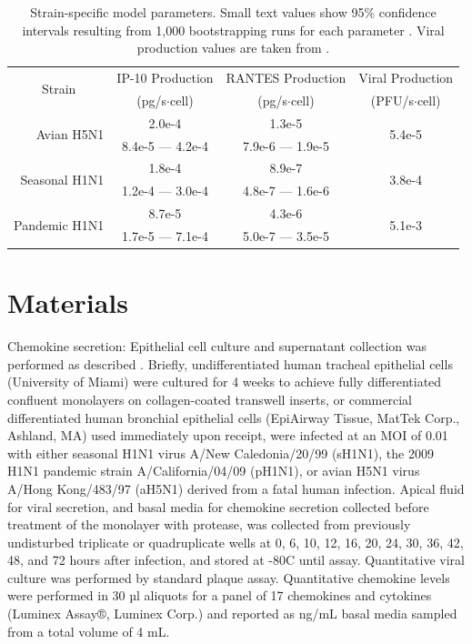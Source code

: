 \documentclass[10pt]{article}
\begin{document}
\begin{table}
\centering
\begin{tabular}{ | r | c | c | c | }
  \hline                        
  \multicolumn{1}{|c|}{\multirow{2}{*}{Strain}} & IP-10 Production & RANTES Production & Viral Production \\
   & \footnotesize{(pg/s$\cdot$cell)}  & \footnotesize{(pg/s$\cdot$cell)} &  \footnotesize{(PFU/s$\cdot$cell)} \\
  \hline
  \multirow{2}{*}{Avian H5N1} & 2.0e-4 &  1.3e-5 & \multirow{2}{*}{5.4e-5} \\
   &  \footnotesize{8.4e-5 --- 4.2e-4} & \footnotesize{7.9e-6 --- 1.9e-5} & \\ 
   \hline
  \multirow{2}{*}{Seasonal H1N1} & 1.8e-4 &  8.9e-7 & \multirow{2}{*}{3.8e-4} \\
   & \footnotesize{1.2e-4 --- 3.0e-4} & \footnotesize{4.8e-7 --- 1.6e-6} &  \\
   \hline
  \multirow{2}{*}{Pandemic H1N1} & 8.7e-5 &  4.3e-6 & \multirow{2}{*}{5.1e-3} \\
   & \footnotesize{1.7e-5 --- 7.1e-4} & \footnotesize{5.0e-7 --- 3.5e-5} &  \\
  \hline
\end{tabular}
\caption{Strain-specific model parameters.  Small text values show 95\% confidence intervals resulting from 1,000 bootstrapping runs for each parameter \cite{Wu1986}.  Viral production values are taken from \cite{Mitchell2011}.}
\label{table:strains}
\end{table}

\section*{Materials}

Chemokine secretion:  Epithelial cell culture and supernatant collection was performed as described \cite{Mitchell2011}.  Briefly, undifferentiated human tracheal epithelial cells (University of Miami) were cultured for 4 weeks to achieve fully differentiated confluent monolayers on collagen-coated transwell inserts, or commercial differentiated human bronchial epithelial cells (EpiAirway Tissue, MatTek Corp., Ashland, MA) used immediately upon receipt, were infected at an MOI of 0.01 with either seasonal H1N1 virus A/New Caledonia/20/99 (sH1N1), the 2009 H1N1 pandemic strain A/California/04/09 (pH1N1), or avian H5N1 virus A/Hong Kong/483/97 (aH5N1) derived from a fatal human infection.  Apical fluid for viral secretion, and basal media for chemokine secretion collected before treatment of the monolayer with protease, was collected from previously undisturbed triplicate or quadruplicate wells at 0, 6, 10, 12, 16, 20, 24, 30, 36, 42, 48, and 72 hours after infection, and stored at -80C until assay.  Quantitative viral culture was performed by standard plaque assay.  Quantitative chemokine levels were performed in 30 µl aliquots for a panel of 17 chemokines and cytokines (Luminex Assay®, Luminex Corp.) and reported as ng/mL basal media sampled from a total volume of 4 mL.
\end{document}
